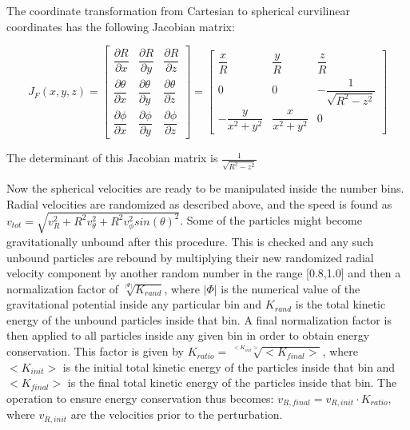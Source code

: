 The coordinate transformation from Cartesian to spherical curvilinear coordinates has the following Jacobian matrix:

\begingroup
\renewcommand*{\arraystretch}{2.5}
\begin{equation}
J_F(x,y,z) = 
\begin{bmatrix}
\dfrac{\partial R}{\partial x} & \dfrac{\partial R}{\partial y} & \dfrac{\partial R}{\partial z} \\ 
\dfrac{\partial \theta}{\partial x} & \dfrac{\partial \theta}{\partial y} & \dfrac{\partial \theta}{\partial z} \\ 
\dfrac{\partial \phi}{\partial x} & \dfrac{\partial \phi}{\partial y} & \dfrac{\partial \phi}{\partial z} 
\end{bmatrix} =
\begin{bmatrix}
\dfrac{x}{R} & \dfrac{y}{R} & \dfrac{z}{R} \\ 
0            &   0          & -\dfrac{1}{\sqrt{R^2-z^2}} \\ 
-\dfrac{y}{x^2+y^2} &  \dfrac{x}{x^2+y^2} & 0 
\end{bmatrix}
\end{equation}
\endgroup

The determinant of this Jacobian matrix is $\frac{1}{\sqrt{R^2-z^2}}$

Now the spherical velocities are ready to be manipulated inside the number bins.
Radial velocities are randomized as described above, and the speed is found as
$ v_{tot} = \sqrt{v_R^2 + R^2v_{\theta}^2 + R^2v_{\phi}^2sin(\theta)^2}$.
Some of the particles might become gravitationally unbound after this procedure. This is checked and any such unbound particles are rebound by multiplying their new randomized radial velocity component by another random number in the range [0.8,1.0] and then a normalization factor of $\sqrt[|\Phi|]{K_{rand}}$, where $|\Phi|$ is the numerical value of the gravitational potential inside any particular bin and $K_{rand}$ is the total kinetic energy of the unbound particles inside that bin.
A final normalization factor is then applied to all particles inside any given bin in order to obtain energy conservation. This factor is given by $K_{ratio} = \sqrt[<K_{init}>]{<K_{final}>}$, where $<K_{init}>$ is the initial total kinetic energy of the particles inside that bin and $<K_{final}>$ is the final total kinetic energy of the particles inside that bin. The operation to ensure energy conservation thus becomes: $ v_{R,final} = v_{R,init} \cdot K_{ratio} $, where $v_{R,init}$ are the velocities prior to the perturbation.  

